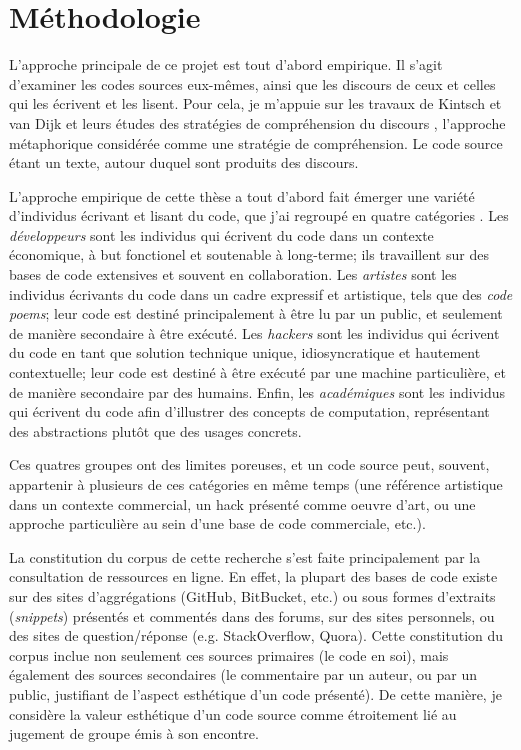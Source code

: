 \documentclass{article}
\begin{document}
\section{Méthodologie}

L'approche principale de ce projet est tout d'abord empirique. Il s'agit d'examiner les codes sources eux-mêmes, ainsi que les discours de ceux et celles qui les écrivent et les lisent. Pour cela, je m'appuie sur les travaux de Kintsch et van Dijk et leurs études des stratégies de compréhension du discours \citep{kintsch_model_1978}, l'approche métaphorique considérée comme une stratégie de compréhension. Le code source étant un texte, autour duquel sont produits des discours.

L'approche empirique de cette thèse a tout d'abord fait émerger une variété d'individus écrivant et lisant du code, que j'ai regroupé en quatre catégories \citep{hayes_cultures_2017}. Les \emph{développeurs} sont les individus qui écrivent du code dans un contexte économique, à but fonctionel et soutenable à long-terme; ils travaillent sur des bases de code extensives et souvent en collaboration. Les \emph{artistes} sont les individus écrivants du code dans un cadre expressif et artistique, tels que des \emph{code poems}; leur code est destiné principalement à être lu par un public, et seulement de manière secondaire à être exécuté. Les \emph{hackers} sont les individus qui écrivent du code en tant que solution technique unique, idiosyncratique et hautement contextuelle; leur code est destiné à être exécuté par une machine particulière, et de manière secondaire par des humains. Enfin, les \emph{académiques} sont les individus qui écrivent du code afin d'illustrer des concepts de computation, représentant des abstractions plutôt que des usages concrets.

Ces quatres groupes ont des limites poreuses, et un code source peut, souvent, appartenir à plusieurs de ces catégories en même temps (une référence artistique dans un contexte commercial, un hack présenté comme oeuvre d'art, ou une approche particulière au sein d'une base de code commerciale, etc.).

La constitution du corpus de cette recherche s'est faite principalement par la consultation de ressources en ligne. En effet, la plupart des bases de code existe sur des sites d'aggrégations (GitHub, BitBucket, etc.) ou sous formes d'extraits (\emph{snippets}) présentés et commentés dans des forums, sur des sites personnels, ou des sites de question/réponse (e.g. StackOverflow, Quora). Cette constitution du corpus inclue non seulement ces sources primaires (le code en soi), mais également des sources secondaires (le commentaire par un auteur, ou par un public, justifiant de l'aspect esthétique d'un code présenté). De cette manière, je considère la valeur esthétique d'un code source comme étroitement lié au jugement de groupe émis à son encontre.
\end{document}
